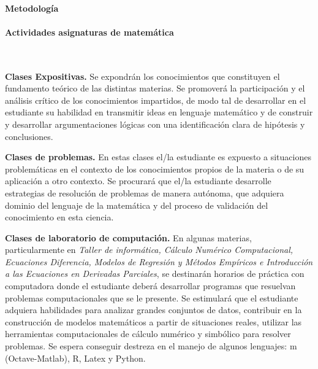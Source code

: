\documentclass[a4paper, 12pt]{article}
\begin{document}
\paragraph{Metodología}


\paragraph{Actividades asignaturas de matemática}\mbox{}\\

 

\begin{description}

\item{ \textbf{Clases Expositivas.}} Se expondrán los conocimientos  que constituyen el   
fundamento teórico de las distintas materias. Se promoverá la participación  y el análisis crítico de los conocimientos impartidos, de modo tal de desarrollar en el estudiante su habilidad en transmitir ideas en lenguaje matemático y de construir y desarrollar argumentaciones lógicas con una identificación clara
de hipótesis y conclusiones.



\item{\textbf{Clases de problemas.}} En estas clases el/la estudiante es expuesto a situaciones problemáticas en el contexto de los conocimientos propios de la   materia o de su aplicación a otro   contexto. Se procurará que el/la estudiante desarrolle estrategias de resolución de  problemas de manera autónoma, que adquiera dominio del lenguaje de la matemática y del proceso de validación del conocimiento en esta ciencia. 

\item{\textbf{Clases de laboratorio de computación.}} En algunas materias, particularmente en  \emph{ Taller de informática, Cálculo
 Numérico Computacional, Ecuaciones Diferencia,   Modelos de Regresión y Métodos Empíricos e Introducción a las Ecuaciones en Derivadas
Parciales}, se destinarán horarios de práctica con computadora donde el estudiante deberá desarrollar programas que resuelvan problemas computacionales que se le presente. Se estimulará que el estudiante adquiera habilidades para analizar grandes conjuntos de datos, contribuir en la construcción de modelos matemáticos a partir de situaciones reales, utilizar las herramientas computacionales de cálculo numérico y simbólico para resolver problemas. Se espera conseguir destreza en el manejo de algunos lenguajes: m (Octave-Matlab), R, Latex y Python. 






\end{description}
\end{document}
